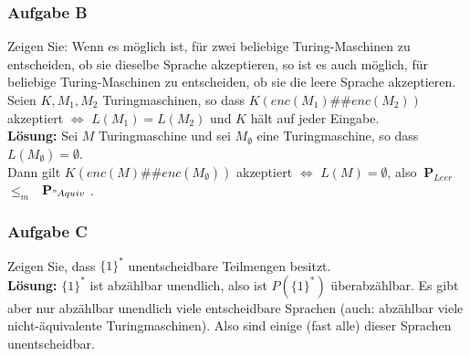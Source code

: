 \documentclass[a4paper,10pt]{article}
\newcommand{\prob}[1]{\textbf{#1}}
\newcommand{\prspec}[1]{$~\prob{P}_{#1}~$}
\begin{document}
    \subsubsection*{Aufgabe B}
        Zeigen Sie: Wenn es möglich ist, für zwei beliebige Turing-Maschinen zu entscheiden, ob sie dieselbe Sprache akzeptieren, so ist es auch möglich, für beliebige Turing-Maschinen zu entscheiden, ob sie die leere Sprache akzeptieren. Seien $K, M_1, M_2$ Turingmaschinen, so dass $K(enc(M_1)\#\#enc(M_2))$ akzeptiert $\Leftrightarrow$ $L(M_1) = L(M_2)$ und $K$ hält auf jeder Eingabe. \\
        \textbf{Lösung:} Sei $M$ Turingmaschine und sei $M_\emptyset$ eine Turingmaschine, so dass $L(M_\emptyset) = \emptyset$. \\
        Dann gilt $K(enc(M)\#\#enc(M_\emptyset))$ akzeptiert $\Leftrightarrow$ $L(M) = \emptyset$, also \prspec{Leer} $\leq_m$ \prspec{"Aquiv}.

    \subsubsection*{Aufgabe C}
        Zeigen Sie, dass $\{1\}^*$ unentscheidbare Teilmengen besitzt. \\
        \textbf{Lösung:} $\{1\}^*$ ist abzählbar unendlich, also ist $P(\{1\}^*)$ überabzählbar. Es gibt aber nur abzählbar unendlich viele entscheidbare Sprachen (auch: abzählbar viele nicht-äquivalente Turingmaschinen). Also sind einige (fast alle) dieser Sprachen unentscheidbar.
\end{document}
